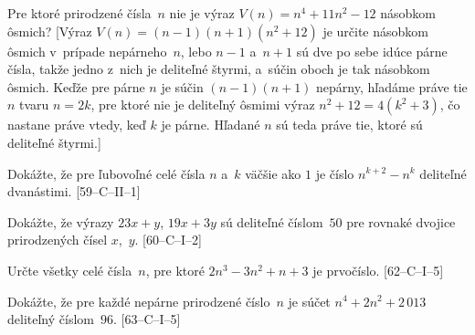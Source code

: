 {\D
Pre ktoré prirodzené čísla~$n$ nie je výraz $V(n)=n^4+11n^2-12$
násobkom ôsmich?
[Výraz $V(n)=(n-1)(n+1)(n^2+12)$ je určite násobkom ôsmich v~prípade
nepárneho~$n$, lebo $n-1$ a~$n+1$ sú dve po sebe idúce párne čísla,
takže jedno z~nich je deliteľné štyrmi, a~súčin oboch je tak
násobkom ôsmich. Keďže pre párne $n$ je súčin $(n-1)(n+1)$
nepárny, hľadáme práve tie $n$ tvaru $n=2k$,
pre ktoré nie je deliteľný ôsmimi výraz $n^2+12=4(k^2+3)$,
čo nastane práve vtedy, keď $k$ je párne. Hľadané $n$ sú teda
práve tie, ktoré sú deliteľné štyrmi.]

Dokážte, že pre ľubovoľné celé čísla $n$ a~$k$ väčšie ako $1$
je číslo $n^{k+2} - n^k$ deliteľné dvanástimi. [59--C--II--1]

Dokážte, že výrazy $23x + y$, $19x + 3y$ sú deliteľné číslom~$50$ pre rovnaké dvojice
prirodzených čísel $x$,~$y$. [60--C--I--2]

Určte všetky celé čísla~$n$, pre ktoré $2n^3-3n^2+n+3$ je prvočíslo. [62--C--I--5]

Dokážte, že pre každé nepárne prirodzené číslo~$n$ je súčet $n^4 + 2n^2 + 2\,013$
deliteľný číslom~$96$. [63--C--I--5]
}

